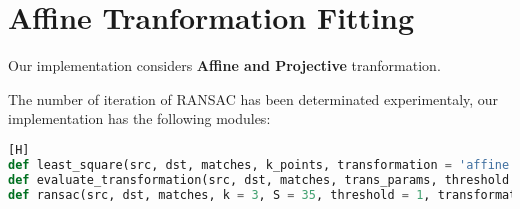 \section{Affine Tranformation Fitting}

Our implementation considers \textbf{Affine and Projective} tranformation.

The number of iteration of RANSAC has been determinated experimentaly, our implementation has the following modules:

\begin{lstlisting}[language=python][H]
def least_square(src, dst, matches, k_points, transformation = 'affine'):
def evaluate_transformation(src, dst, matches, trans_params, threshold = 1, evaluation_method = 'ramsac', transformation = 'affine'):
def ransac(src, dst, matches, k = 3, S = 35, threshold = 1, transformation = 'affine'):
\end{lstlisting}

